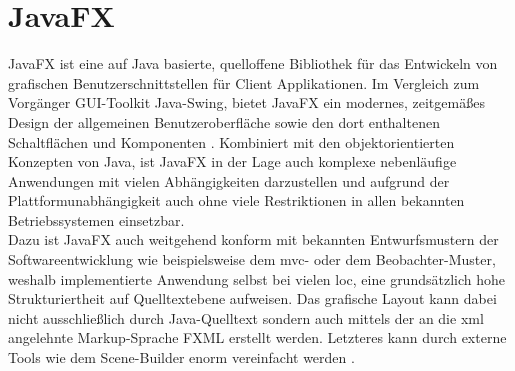 \section{JavaFX}
\label{javafx}
\noindent JavaFX ist eine auf Java basierte, quelloffene Bibliothek für das Entwickeln von grafischen Benutzerschnittstellen für Client Applikationen. Im Vergleich zum Vorgänger GUI-Toolkit Java-Swing, bietet JavaFX ein modernes, zeitgemäßes Design der allgemeinen Benutzeroberfläche sowie den dort enthaltenen Schaltflächen und Komponenten \cite{Sharan2015}. Kombiniert mit den objektorientierten Konzepten von Java, ist JavaFX in der Lage auch komplexe nebenläufige Anwendungen mit vielen Abhängigkeiten darzustellen und aufgrund der Plattformunabhängigkeit auch ohne viele Restriktionen in allen bekannten Betriebssystemen einsetzbar.\\
Dazu ist JavaFX auch weitgehend konform mit bekannten Entwurfsmustern der Softwareentwicklung wie beispielsweise dem \ac{mvc}- oder dem Beobachter-Muster, weshalb implementierte Anwendung selbst bei vielen \ac{loc}, eine grundsätzlich hohe Strukturiertheit auf Quelltextebene aufweisen. Das grafische Layout kann dabei nicht ausschließlich durch Java-Quelltext sondern auch mittels der an die \ac{xml} angelehnte Markup-Sprache FXML erstellt werden. Letzteres kann durch externe Tools wie dem Scene-Builder enorm vereinfacht werden \cite{Vos2018}.

